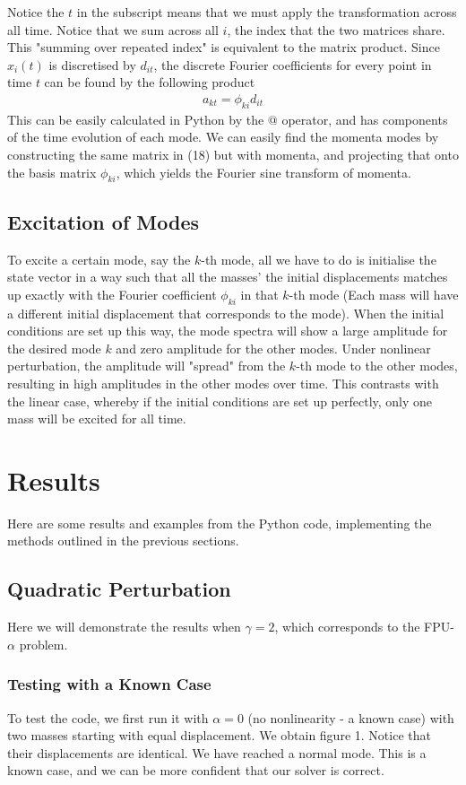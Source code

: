 \documentclass{article}
\begin{document}
Notice the $t$ in the subscript means that we must apply the transformation across 
all time. Notice that we sum across all $i$, the index that the two matrices share. 
This "summing over repeated index"
is equivalent to the matrix product. Since $x_{i}(t)$ is discretised by $d_{it}$,
 the discrete Fourier coefficients for every point in time $t$ can be found by 
the following product 
\begin{align}
    a_{kt}=\phi_{ki}d_{it}
\end{align}
This can be easily calculated in Python by the $@$ operator, and has components of the time 
evolution of each mode. We can easily find the momenta modes by constructing the same matrix 
in (18) but with momenta, and projecting that onto the basis matrix $\phi_{ki}$, which yields 
the Fourier sine transform of momenta.

\subsection{Excitation of Modes}
To excite a certain mode, say the $k$-th mode, 
all we have to do is initialise the state vector 
in a way such that all the masses'
the initial displacements matches up
 exactly with the Fourier coefficient $\phi_{ki}$ in that $k$-th mode (Each mass
 will have a different initial displacement that corresponds to the mode). When the initial conditions are set up this way, the mode spectra 
will show a large amplitude for the desired mode $k$ and zero amplitude
 for the other modes.
Under nonlinear perturbation, 
the amplitude will "spread" from 
the $k$-th mode to the other modes, 
resulting in high amplitudes in the other modes over time. This contrasts with the linear case, 
whereby if the initial conditions are set up perfectly, 
only one mass will be excited for all time.
\section{Results}
Here are some results and examples from the Python code, implementing the methods outlined in the previous sections.
\subsection{Quadratic Perturbation}
Here we will demonstrate the results when $\gamma=2$, which corresponds to the FPU-$\alpha$ problem.
\subsubsection{Testing with a Known Case}
To test the code, we first run it with $\alpha=0$ (no nonlinearity - a known case) with two masses 
starting with equal displacement. We obtain figure 1.
Notice that their displacements are identical. We have reached a normal mode. This is 
a known case, and we can be more confident that our solver is correct.
\end{document}
